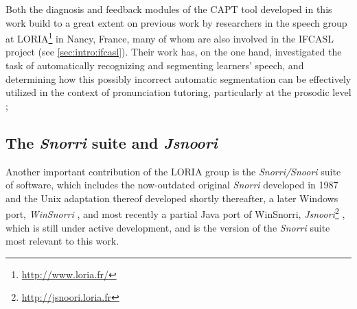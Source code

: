 		
	Both the diagnosis and feedback modules of the CAPT tool developed in this work build to a great extent on previous work by researchers in the speech group at LORIA\footnote{\url{http://www.loria.fr/}} in Nancy, France, many of whom are also involved in the IFCASL project (see \cref{sec:intro:ifcasl}). 
	 Their work has, on the one hand, investigated the task of automatically recognizing and segmenting learners' speech, and determining how this possibly incorrect automatic segmentation can be effectively utilized in the context of pronunciation tutoring, particularly at the prosodic level \citep{Mesbahi2011,Orosanu2012}; 
	
	\subsection{The \textit{Snorri} suite and \textit{Jsnoori}}
	\label{sec:capt:snoori}
	
	Another important contribution of the LORIA group is 
	the \textit{Snorri/Snoori} suite of software, 
	which includes the now-outdated original \textit{Snorri} developed in 1987 \citep{Fohr1989} and the Unix adaptation thereof developed shortly thereafter,
	a later Windows port, \textit{WinSnorri} \citep{Laprie1999},
	and most recently a partial Java port of WinSnorri, \textit{Jsnoori}\footnote{\url{http://jsnoori.loria.fr}} \citep{Parole2013}, which is still under active development, and is the version of the \textit{Snorri} suite most relevant to this work.
	
	
